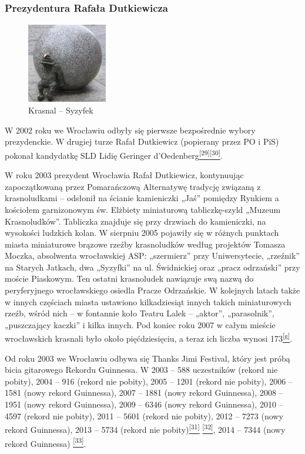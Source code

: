 \documentclass{article}
\begin{document}
\subsubsection{Prezydentura Rafała Dutkiewicza}

\begin{figure}
\includegraphics[width=3.5cm, height=3.5cm]{images/Zdjecie21.jpg}
\caption{Krasnal – Syzyfek}
\end{figure}

W 2002 roku we Wrocławiu odbyły się pierwsze bezpośrednie wybory prezydenckie. W drugiej turze Rafał Dutkiewicz (popierany przez PO i PiS) pokonał kandydatkę SLD Lidię Geringer d’Oedenberg\hyperlink{29}{\textsuperscript{[29]}}\hyperlink{30}{\textsuperscript{[30]}}.

W roku 2003 prezydent Wrocławia Rafał Dutkiewicz, kontynuując zapoczątkowaną przez Pomarańczową Alternatywę tradycję związaną z krasnoludkami – odsłonił na ścianie kamieniczki „Jaś” pomiędzy Rynkiem a kościołem garnizonowym św. Elżbiety miniaturową tabliczkę-szyld „Muzeum Krasnoludków”. Tabliczka znajduje się przy drzwiach do kamieniczki, na wysokości ludzkich kolan. W sierpniu 2005 pojawiły się w różnych punktach miasta miniaturowe brązowe rzeźby krasnoludków według projektów Tomasza Moczka, absolwenta wrocławskiej ASP: „szermierz” przy Uniwersytecie, „rzeźnik” na Starych Jatkach, dwa „Syzyfki” na ul. Świdnickiej oraz „pracz odrzański” przy moście Piaskowym. Ten ostatni krasnoludek nawiązuje swą nazwą do peryferyjnego wrocławskiego osiedla Pracze Odrzańskie. W kolejnych latach także w innych częściach miasta ustawiono kilkadziesiąt innych takich miniaturowych rzeźb, wśród nich – w fontannie koło Teatru Lalek – „aktor”, „parasolnik”, „puszczający kaczki” i kilka innych. Pod koniec roku 2007 w całym mieście wrocławskich krasnali było około pięćdziesięciu, a teraz ich liczba wynosi 173\hyperlink{g}{\textsuperscript{[g]}}.

Od roku 2003 we Wrocławiu odbywa się Thanks Jimi Festival, który jest próbą bicia gitarowego Rekordu Guinnessa. W 2003 – 588 uczestników (rekord nie pobity), 2004 – 916 (rekord nie pobity), 2005 – 1201 (rekord nie pobity), 2006 – 1581 (nowy rekord Guinnessa), 2007 – 1881 (nowy rekord Guinnessa), 2008 – 1951 (nowy rekord Guinnessa), 2009 – 6346 (nowy rekord Guinnessa), 2010 – 4597 (rekord nie pobity), 2011 – 5601 (rekord nie pobity), 2012 – 7273 (nowy rekord Guinnessa), 2013 – 5734 (rekord nie pobity)\hyperlink{31}{\textsuperscript{[31]}} \hyperlink{32}{\textsuperscript{[32]}}, 2014 – 7344 (nowy rekord Guinnessa) \hyperlink{33}{\textsuperscript{[33]}}.
\end{document}
